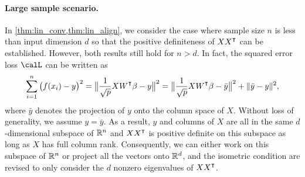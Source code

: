 \paragraph{Large sample scenario.} In \cref{thm:lin_conv,thm:lin_align}, we consider the case where sample size $n$ is less than input dimension $d$ so that the positive definiteness of $XX\transpose$ can be established. However, both results still hold for $n>d$. In fact, the squared error loss $\calL$ can be written as
\begin{equation*}
\sum_{i=1}^n\big(f(x_i)-y\big)^2 = \big\|\frac{1}{\sqrt{p}}XW\transpose\beta-y\big\|^2 = \big\|\frac{1}{\sqrt{p}}XW\transpose\beta-\bar{y}\big\|^2+ \|\bar{y}-y\|^2,
\end{equation*}
where $\bar{y}$ denotes the projection of $y$ onto the column space of $X$. Without loss of generality, we assume $y=\bar{y}$. As a result, $y$ and columns of $X$ are all in the same $d$-dimensional subspace of ${\mathbb{R}^n}$ and $XX\transpose$ is positive definite on this subspace as long as $X$ has full column rank. Consequently, we can either work on this subspace of ${\mathbb{R}^n}$ or project all the vectors onto ${\mathbb{R}^{d}}$, and the isometric condition are revised to only consider the $d$ nonzero eigenvalues of $XX\transpose$.
